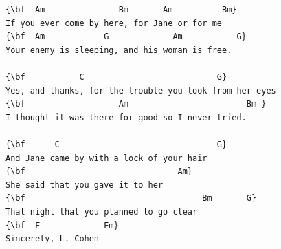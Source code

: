 \documentclass[a4paper]{article}
\begin{document}
\begin{Verbatim}[commandchars=\\\{\}]
{\bf  Am               Bm       Am          Bm}
If you ever come by here, for Jane or for me
{\bf  Am            G             Am           G}
Your enemy is sleeping, and his woman is free.

{\bf           C                           G}
Yes, and thanks, for the trouble you took from her eyes
{\bf                   Am                        Bm }
I thought it was there for good so I never tried.

{\bf      C                                G}
And Jane came by with a lock of your hair
{\bf                               Am}
She said that you gave it to her
{\bf                                    Bm       G}
That night that you planned to go clear
{\bf  F             Em}
Sincerely, L. Cohen

\end{Verbatim}
\newpage
\end{document}

